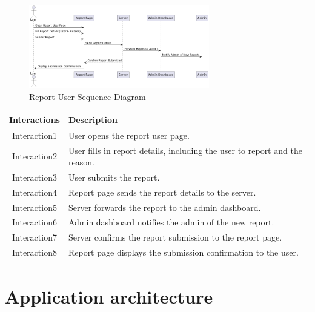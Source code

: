 \newpage
\begin{figure}[h]
    \centering
    \includegraphics[width=0.7\textwidth]{images/report_user.png} %
    \caption{Report User Sequence Diagram}
    \label{fig:example}
\end{figure}


\begin{longtable}{|c|p{10cm}|}
    \hline
    \textbf{Interactions} & \textbf{Description} \\
    \hline
    Interaction1 & User opens the report user page. \\
    \hline
    Interaction2 & User fills in report details, including the user to report and the reason. \\
    \hline
    Interaction3 & User submits the report. \\
    \hline
    Interaction4 & Report page sends the report details to the server. \\
    \hline
    Interaction5 & Server forwards the report to the admin dashboard. \\
    \hline
    Interaction6 & Admin dashboard notifies the admin of the new report. \\
    \hline
    Interaction7 & Server confirms the report submission to the report page. \\
    \hline
    Interaction8 & Report page displays the submission confirmation to the user. \\
    \hline
\end{longtable}

\chapter{Application architecture }

